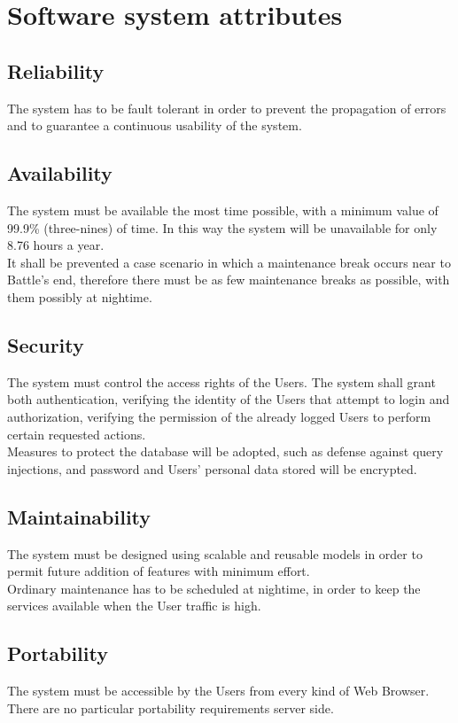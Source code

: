\section{Software system attributes}
\label{sec:software_system_attributes}%

\subsection{Reliability}
\label{subsec:reliability}%
The system has to be fault tolerant in order to prevent the propagation of errors and to guarantee a continuous usability of the system.

\subsection{Availability}
\label{subsec:availability}%
The system must be available the most time possible, with a minimum value of 99.9\% (three-nines) of time. In this way the system will be unavailable for only 8.76 hours a year. \\
It shall be prevented a case scenario in which a maintenance break occurs near to Battle's end, therefore there must be as few maintenance breaks as possible, with them possibly at nightime.

\subsection{Security}
\label{subsec:security}%
The system must control the access rights of the Users. The system shall grant both authentication, verifying the identity of the Users that attempt to login and authorization, verifying the permission of the already logged Users to perform certain requested actions. \\
Measures to protect the database will be adopted, such as defense against query injections, and password and Users' personal data stored will be encrypted.


\subsection{Maintainability}
\label{subsec:maintainability}%
The system must be designed using scalable and reusable models in order to permit future addition of features with minimum effort. \\
Ordinary maintenance has to be scheduled at nightime, in order to keep the services available when the User traffic is high.

\subsection{Portability}
\label{subsec:portability}%
The system must be accessible by the Users from every kind of Web Browser.\\ 
There are no particular portability requirements server side.



